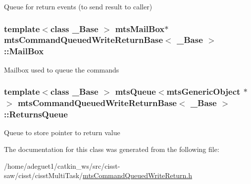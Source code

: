 Queue for return events (to send result to caller) \hypertarget{classmts_command_queued_write_return_base_ab619fecbd720f4b87db6169d1f210e16}{
\subsubsection[{Mail\-Box}]{\setlength{\rightskip}{0pt plus 5cm}template$<$class \-\_\-\-Base $>$ {\bf mts\-Mail\-Box}$\ast$ {\bf mts\-Command\-Queued\-Write\-Return\-Base}$<$ \-\_\-\-Base $>$\-::Mail\-Box\hspace{0.3cm}{\ttfamily [protected]}}}\label{classmts_command_queued_write_return_base_ab619fecbd720f4b87db6169d1f210e16}
Mailbox used to queue the commands \hypertarget{classmts_command_queued_write_return_base_a24118cfab2f7edbc060a3513787900c7}{
\subsubsection[{Returns\-Queue}]{\setlength{\rightskip}{0pt plus 5cm}template$<$class \-\_\-\-Base $>$ {\bf mts\-Queue}$<${\bf mts\-Generic\-Object} $\ast$$>$ {\bf mts\-Command\-Queued\-Write\-Return\-Base}$<$ \-\_\-\-Base $>$\-::Returns\-Queue\hspace{0.3cm}{\ttfamily [protected]}}}\label{classmts_command_queued_write_return_base_a24118cfab2f7edbc060a3513787900c7}
Queue to store pointer to return value 

The documentation for this class was generated from the following file\-:\begin{DoxyCompactItemize}
\item 
/home/adeguet1/catkin\-\_\-ws/src/cisst-\/saw/cisst/cisst\-Multi\-Task/\hyperlink{mts_command_queued_write_return_8h}{mts\-Command\-Queued\-Write\-Return.\-h}\end{DoxyCompactItemize}
